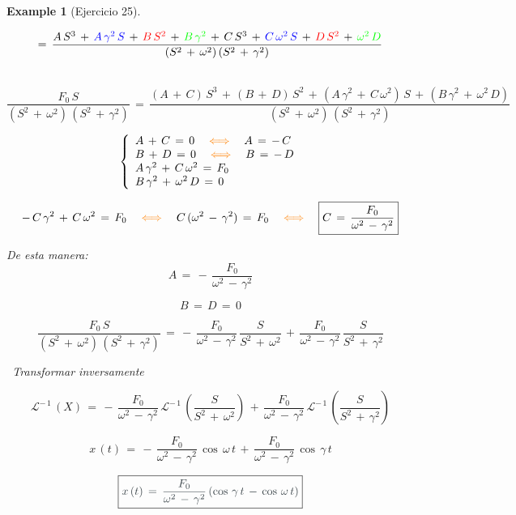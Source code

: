 \documentclass[a4paper,11pt,openany]{book}
\newtheorem{exmp}{Example}[section]
\begin{document}
\begin{exmp}[Ejercicio 25]
\begin{tcolorbox}[colback=orange!5!white,colframe=orange!75!black,fonttitle=\bfseries,title=\sf Aparte]
$$=\,\dfrac{A\,S^{3}\,+\,\textcolor{blue}{A\,\gamma^{2}\,S}\,+\,\textcolor{red}{B\,S^{2}}\,+\,\textcolor{green}{B\,\gamma^{2}}\,+\,C\,S^{3}\,+\,\textcolor{blue}{C\,\omega^{2}\,S}\,+\,\textcolor{red}{D\,S^{2}}\,+\,\textcolor{green}{\omega^{2}\,D} }{(S^{2}\,+\,\omega^{2})\,(S^{2}\,+\,\gamma^{2})}$$
 
\textcolor{orange}{}\, $$\dfrac{F_{0}\,S}{(S^{2}\,+\,\omega^{2})\,(S^{2}\,+\,\gamma^{2})}\,=\,\dfrac{(A\,+\,C)\,S^{3}\,+\,(B\,+\,D)\,S^{2}\,+\,(A\,\gamma^{2}\,+\,C\,\omega^{2})\,S\,+\,(B\,\gamma^{2}\,+\,\omega^{2}\,D) }{(S^{2}\,+\,\omega^{2})\,(S^{2}\,+\,\gamma^{2})}$$
 
$$\left\{
\begin{array}{ll}
A\,+\,C\,=\,0 \quad \textcolor{orange}{\iff} \quad A\,=\,-\,C \\
B\,+\,D\,=\,0 \quad \textcolor{orange}{\iff} \quad B\,=\,-\,D \\
A\,\gamma^{2}\,+\,C\,\omega^{2}\,=\,F_{0} \\
B\,\gamma^{2}\,+\,\omega^{2}\,D\,=\,0
\end{array}
\right.$$
 
$$-\,C\,\gamma^{2}\,+\,C\,\omega^{2}\,=\,F_{0} \quad \textcolor{orange}{\iff} \quad C\,(\omega^{2}\,-\,\gamma^{2} )\,=\,F_{0} \quad \textcolor{orange}{\iff} \quad \boxed{C\,=\,\dfrac{F_{0}}{\omega^{2}\,-\,\gamma^{2}} }$$
 
De esta manera: $$\boxed{A\,=\,-\,\dfrac{F_{0}}{\omega^{2}\,-\,\gamma^{2} } }$$
 
$$\boxed{B\,=\,D\,=\,0}$$
 
$$\dfrac{F_{0}\,S}{(S^{2}\,+\,\omega^{2})\,(S^{2}\,+\,\gamma^{2})}\,=\,-\,\dfrac{F_{0}}{\omega^{2}\,-\,\gamma^{2} }\,\dfrac{S }{S^{2}\,+\,\omega^{2}}\,+\,\dfrac{F_{0}}{\omega^{2}\,-\,\gamma^{2}}\,\dfrac{S}{S^{2}\,+\,\gamma^{2} }$$
 
\end{tcolorbox}
 
\textcolor{arsenic}{}\, Transformar inversamente
 
$$\mathcal{L}^{-\,1}\,\left(X \right)\,=\,-\,\dfrac{F_{0}}{\omega^{2}\,-\,\gamma^{2} }\,\mathcal{L}^{-\,1}\,\left(\dfrac{S }{S^{2}\,+\,\omega^{2}} \right)\,+\,\dfrac{F_{0}}{\omega^{2}\,-\,\gamma^{2}}\,\mathcal{L}^{-\,1}\,\left(\dfrac{S}{S^{2}\,+\,\gamma^{2} } \right)$$
 
$$x\,(t)\,=\,-\,\dfrac{F_{0}}{\omega^{2}\,-\,\gamma^{2} }\,\cos\,\omega\,t\,+\,\dfrac{F_{0}}{\omega^{2}\,-\,\gamma^{2}}\,\cos\,\gamma\,t$$
 
$$\boxed{\textcolor{arsenic}{x\,(t)\,=\,\dfrac{F_{0}}{\omega^{2}\,-\,\gamma^{2} }\,(\cos\,\gamma\,t\,-\,\cos\,\omega\,t) } } $$
 
\end{exmp}
 
\end{document}
